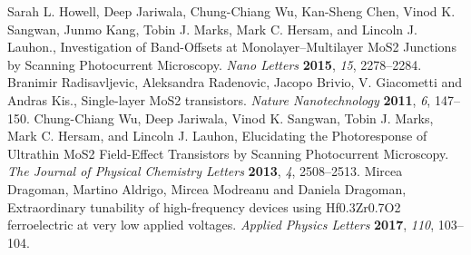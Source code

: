 \documentclass[electronics,article,submit,moreauthors,pdftex]{Definitions/mdpi}
\begin{document}
\begin{thebibliography}{999}
	Sarah L. Howell, Deep Jariwala, Chung-Chiang Wu, Kan-Sheng Chen, Vinod K. Sangwan, Junmo Kang, Tobin J. Marks, Mark C. Hersam, and Lincoln J. Lauhon., Investigation of Band-Offsets at Monolayer–Multilayer MoS2 Junctions by Scanning Photocurrent Microscopy. {\em Nano Letters} {\bf 2015}, {\em 15}, 2278--2284.
	Branimir Radisavljevic, Aleksandra Radenovic, Jacopo Brivio, V. Giacometti and Andras Kis., Single-layer MoS2 transistors. {\em Nature Nanotechnology}  {\bf 2011}, {\em 6}, 147--150.
	Chung-Chiang Wu, Deep Jariwala, Vinod K. Sangwan, Tobin J. Marks, Mark C. Hersam, and Lincoln J. Lauhon, Elucidating the Photoresponse of Ultrathin MoS2 Field-Effect Transistors by Scanning Photocurrent Microscopy. {\em The Journal of Physical Chemistry Letters}  {\bf 2013}, {\em 4}, 2508--2513.
	Mircea Dragoman, Martino Aldrigo, Mircea Modreanu and Daniela Dragoman, Extraordinary tunability of high-frequency devices using Hf0.3Zr0.7O2 ferroelectric at very low applied voltages. {\em Applied Physics Letters}  {\bf 2017}, {\em 110}, 103--104.
\end{thebibliography}
\end{document}
